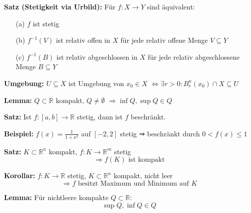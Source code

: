 \begin{itemize}
\textbf{Satz (Stetigkeit via Urbild):}  
Für \(f: X \to Y\) sind äquivalent:
\begin{itemize}
  \item[(a)] \(f\) ist stetig
  \item[(b)] \(f^{-1}(V)\) ist relativ offen in \(X\) für jede relativ offene Menge \(V \subseteq Y\)
  \item[(c)] \(f^{-1}(B)\) ist relativ abgeschlossen in \(X\) für jede relativ abgeschlossene Menge \(B \subseteq Y\)
\end{itemize}

\textbf{Umgebung:}  
\(U \subseteq X\) ist Umgebung von \(x_0 \in X\)  
\(\Leftrightarrow \exists r > 0: B_r^n(x_0) \cap X \subseteq U\)

\textbf{Lemma:}  
\(Q \subset \mathbb{R}\) kompakt, \(Q \ne \emptyset\)  
\(\Rightarrow \inf Q, \sup Q \in Q\)

\textbf{Satz:}  
Ist \( f: [a,b] \to \mathbb{R} \) stetig, dann ist \( f \) beschränkt.

\textbf{Beispiel:}  
\( f(x) = \frac{1}{1 + x^2} \) auf \( [-2, 2] \) stetig ⇒ beschränkt durch \( 0 < f(x) \leq 1 \)

\textbf{Satz:}  
\( K \subset \mathbb{R}^n \) kompakt,\; \( f: K \to \mathbb{R}^m \) stetig  
\[
\Rightarrow f(K) \text{ ist kompakt}
\]


\textbf{Korollar:}  
\( f: K \to \mathbb{R} \) stetig, \( K \subset \mathbb{R}^n \) kompakt, nicht leer  
\[
\Rightarrow f \text{ besitzt Maximum und Minimum auf } K
\]


\textbf{Lemma:}  
Für nichtleere kompakte \( Q \subset \mathbb{R} \):  
\[
\sup Q, \inf Q \in Q
\]


\end{itemize}
